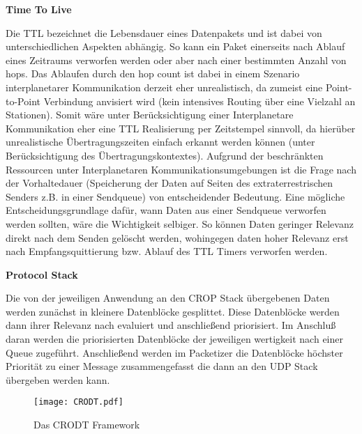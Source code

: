 \label{sec:Vorueberlegung}

\textbf{Time To Live}

Die TTL bezeichnet die Lebensdauer eines Datenpakets und ist dabei von
unterschiedlichen Aspekten abh{\"a}ngig. So kann ein Paket einerseits nach
Ablauf eines Zeitraums verworfen werden oder aber nach einer bestimmten Anzahl
von hops. Das Ablaufen durch den hop count ist dabei in einem Szenario
interplanetarer Kommunikation derzeit eher unrealistisch, da zumeist eine
Point-to-Point Verbindung anvisiert wird (kein intensives Routing {\"u}ber eine
Vielzahl an Stationen). Somit w{\"a}re unter Ber{\"u}cksichtigung einer
Interplanetare Kommunikation eher eine TTL Realisierung per Zeitstempel
sinnvoll, da hier{\"u}ber unrealistische {\"U}bertragungszeiten einfach erkannt
werden k{\"o}nnen (unter Ber{\"u}cksichtigung des {\"U}bertragungskontextes).
Aufgrund der beschr{\"a}nkten Ressourcen unter Interplanetaren
Kommunikationsumgebungen ist die Frage nach der Vorhaltedauer (Speicherung der
Daten auf Seiten des extraterrestrischen Senders z.B. in einer Sendqueue) von
entscheidender Bedeutung.
Eine m{\"o}gliche Entscheidungsgrundlage daf{\"u}r, wann Daten aus einer
Sendqueue verworfen werden sollten, w{\"a}re die Wichtigkeit selbiger. So
k{\"o}nnen Daten geringer Relevanz direkt nach dem Senden gel{\"o}scht werden,
wohingegen daten hoher Relevanz erst nach Empfangsquittierung bzw. Ablauf des
TTL Timers verworfen werden.

\newpage %
\textbf{Protocol Stack}

Die von der jeweiligen Anwendung an den CROP Stack {\"u}bergebenen Daten werden
zun{\"a}chst in kleinere Datenbl{\"o}cke gesplittet. Diese Datenbl{\"o}cke
werden dann ihrer Relevanz nach evaluiert und anschlie{\ss}end priorisiert. Im
Anschlu{\ss} daran werden die priorisierten Datenbl{\"o}cke der jeweiligen
wertigkeit nach einer Queue zugef{\"u}hrt. Anschlie{\ss}end werden im Packetizer
die Datenbl{\"o}cke h{\"o}chster Priorit{\"a}t zu einer Message zusammengefasst
die dann an den UDP Stack {\"u}bergeben werden kann.

\begin{figure}[H]
\centering
\texttt{[image: CRODT.pdf]}
\caption{Das CRODT Framework}
\label{fig:CRODT}
\end{figure}

